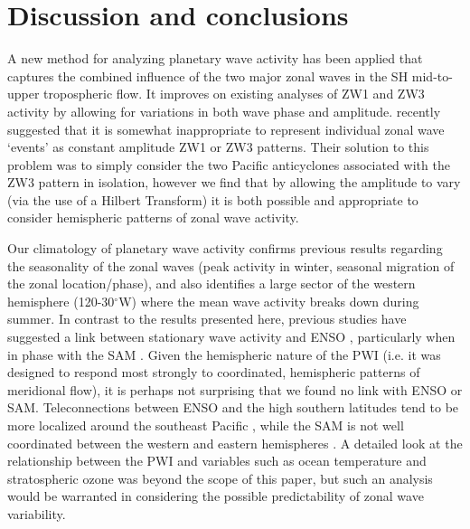 \section{Discussion and conclusions}

A new method for analyzing planetary wave activity has been applied that captures the combined influence of the two major zonal waves in the SH mid-to-upper tropospheric flow. It improves on existing analyses of ZW1 and ZW3 activity by allowing for variations in both wave phase and amplitude. \citet{Hobbs2010} recently suggested that it is somewhat inappropriate to represent individual zonal wave `events' as constant amplitude ZW1 or ZW3 patterns. Their solution to this problem was to simply consider the two Pacific anticyclones associated with the ZW3 pattern in isolation, however we find that by allowing the amplitude to vary (via the use of a Hilbert Transform) it is both possible and appropriate to consider hemispheric patterns of zonal wave activity.  

Our climatology of planetary wave activity confirms previous results regarding the seasonality of the zonal waves (peak activity in winter, seasonal migration of the zonal location/phase), and also identifies a large sector of the western hemisphere (120-30$^{\circ}$W) where the mean wave activity breaks down during summer. In contrast to the results presented here, previous studies have suggested a link between stationary wave activity and ENSO \citep[e.g.][]{Trenberth1980,Raphael2003,Hobbs2007}, particularly when in phase with the SAM \citep{Pezza2012}. Given the hemispheric nature of the PWI (i.e. it was designed to respond most strongly to coordinated, hemispheric patterns of meridional flow), it is perhaps not surprising that we found no link with ENSO or SAM. Teleconnections between ENSO and the high southern latitudes tend to be more localized around the southeast Pacific \citep{Turner2004}, while the SAM is not well coordinated between the western and eastern hemispheres \citep{Ding2012}. A detailed look at the relationship between the PWI and variables such as ocean temperature and stratospheric ozone was beyond the scope of this paper, but such an analysis would be warranted in considering the possible predictability of zonal wave variability.

